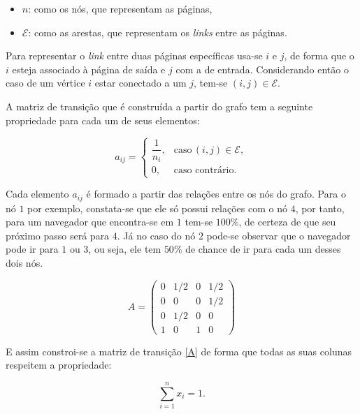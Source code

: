 \begin{itemize}
\item $n$: como os n\'os, que representam as p\'aginas,

\vspace{0.1cm}
	
\item $\mathcal{E}$: como as arestas, que representam os \textit{links} entre as páginas.
\end{itemize}

Para representar o \textit{link} entre duas páginas específicas usa-se $i$ e $j$, de forma que o $i$ esteja associado à página de saída e $j$ com a de entrada. Considerando então o caso de um v\'ertice $i$ estar conectado a um $j$, tem-se $(i,j) \in \mathcal{E}$.

A matriz de transição que é construída a partir do grafo tem a seguinte propriedade para cada um de seus elementos:

\begin{equation}\label{a}
a_{ij} = \begin{cases}
\dfrac{1}{n_i}, & \text{caso}\, (i,j)\in \mathcal{E},\\
0, & \text{caso contr\'ario}.
\end{cases}
\end{equation}	

Cada elemento $a_{ij}$ é formado a partir das relações entre os nós do grafo. Para o nó $1$ por exemplo, constata-se que ele só possui relações com o nó $4$, por tanto, para um navegador que encontra-se em $1$ tem-se $100\%$, de certeza de que seu próximo passo será para $4$. Já no caso do nó $2$ pode-se observar que o navegador pode ir para $1$ ou $3$, ou seja, ele tem $50\%$ de chance de ir para cada um desses dois nós.

\begin{equation}\label{A}
A = \begin{pmatrix}
 0 & 1/2 & 0 & 1/2 \\
 0 &  0  & 0 & 1/2 \\
 0 & 1/2 & 0 &  0  \\
 1 &  0  & 1 &  0
\end{pmatrix}
\end{equation}

E assim constroi-se a matriz de transição \eqref{A} de forma que todas as suas colunas respeitem a propriedade:

\begin{equation}\label{n}
\sum^{n}_{i=1} x_{i} = 1.
\end{equation}

